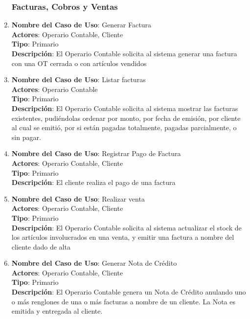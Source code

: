 \documentclass[12pt]{extarticle}
\begin{document}
\begin{spacing}{1.2}
\begin{enumerate}
        \subsubsection{Facturas, Cobros y Ventas}



        \item 	\textbf{Nombre del Caso de Uso}: Generar Factura\\
                \textbf{Actores}: Operario Contable, Cliente\\
                \textbf{Tipo}: Primario\\
                \textbf{Descripción}: El Operario Contable solicita al sistema generar una factura con una OT cerrada o con artículos vendidos

        \item 	\textbf{Nombre del Caso de Uso}: Listar facturas\\
                \textbf{Actores}: Operario Contable\\
                \textbf{Tipo}: Primario\\
                \textbf{Descripción}: El Operario Contable solicita al sistema mostrar las facturas existentes, pudiéndolas ordenar por monto, por fecha de emisión, por cliente al cual se emitió, por si están pagadas totalmente, pagadas parcialmente, o sin pagar.

        \item 	\textbf{Nombre del Caso de Uso}: Registrar Pago de Factura\\
                \textbf{Actores}: Operario Contable, Cliente\\
                \textbf{Tipo}: Primario\\
                \textbf{Descripción}: El cliente realiza el pago de una factura
        
        \item 	\textbf{Nombre del Caso de Uso}: Realizar venta\\
                \textbf{Actores}: Operario Contable, Cliente\\
                \textbf{Tipo}: Primario\\
                \textbf{Descripción}: El Operario Contable solicita al sistema actualizar el stock de los artículos involucrados en una venta, y emitir una factura a nombre del cliente dado de alta

        \item 	\textbf{Nombre del Caso de Uso}: Generar Nota de Crédito\\
                \textbf{Actores}: Operario Contable, Cliente\\
                \textbf{Tipo}: Primario\\
                \textbf{Descripción}: El Operario Contable genera un Nota de Crédito anulando uno o más renglones de una o más facturas a nombre de un cliente. La Nota es emitida y entregada al cliente.




\end{enumerate}
\end{spacing}
\end{document}
